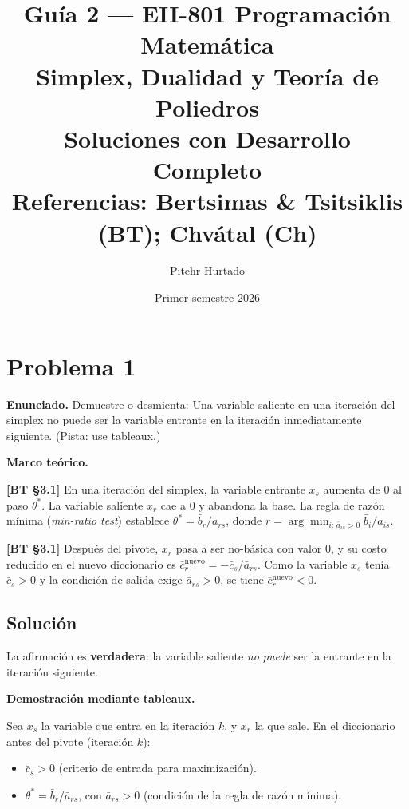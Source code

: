 \documentclass{article}
\title{\textbf{Guía 2 --- EII-801 Programación Matemática\\[4pt]
\large Simplex, Dualidad y Teoría de Poliedros\\[2pt]
\normalsize Soluciones con Desarrollo Completo\\
Referencias: Bertsimas \& Tsitsiklis (BT); Chvátal (Ch)}}
\author{Pitehr Hurtado}
\date{Primer semestre 2026}
\newenvironment{marco}{\begin{mdframed}[linecolor=black!40,backgroundcolor=gray!5]\small\textbf{Marco teórico.}\par\smallskip}{\end{mdframed}\medskip}
\begin{document}
\maketitle
\tableofcontents
\newpage

\section*{Problema 1}

\textbf{Enunciado.} Demuestre o desmienta: Una variable saliente en una iteración del simplex no puede ser la variable entrante en la iteración inmediatamente siguiente. (Pista: use tableaux.)

\begin{marco}
\textbf{[BT §3.1]} En una iteración del simplex, la variable entrante $x_s$ aumenta de $0$ al paso $\theta^*$. La variable saliente $x_r$ cae a $0$ y abandona la base. La regla de razón mínima (\emph{min-ratio test}) establece $\theta^* = \bar{b}_r/\bar{a}_{rs}$, donde $r = \arg\min_{i:\,\bar{a}_{is}>0}\bar{b}_i/\bar{a}_{is}$.

\textbf{[BT §3.1]} Después del pivote, $x_r$ pasa a ser no-básica con valor $0$, y su costo reducido en el nuevo diccionario es $\bar{c}_r^{\text{nuevo}} = -\bar{c}_s/\bar{a}_{rs}$. Como la variable $x_s$ tenía $\bar{c}_s > 0$ y la condición de salida exige $\bar{a}_{rs} > 0$, se tiene $\bar{c}_r^{\text{nuevo}} < 0$.
\end{marco}

\subsection*{Solución}

La afirmación es \textbf{verdadera}: la variable saliente \emph{no puede} ser la entrante en la iteración siguiente.

\medskip
\textbf{Demostración mediante tableaux.}

Sea $x_s$ la variable que entra en la iteración $k$, y $x_r$ la que sale. En el diccionario antes del pivote (iteración $k$):
\begin{itemize}
  \item $\bar{c}_s > 0$ (criterio de entrada para maximización).
  \item $\theta^* = \bar{b}_r/\bar{a}_{rs}$, con $\bar{a}_{rs} > 0$ (condición de la regla de razón mínima).
\end{itemize}
\end{document}
